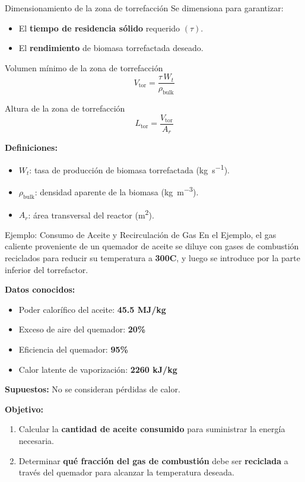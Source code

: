 \documentclass[main.tex]{subfiles}
\begin{document}
\begin{frame}{Dimensionamiento de la zona de torrefacción}
\footnotesize
Se dimensiona para garantizar:
\begin{itemize}
  \item El \textbf{tiempo de residencia sólido} requerido $(\tau)$.
  \item El \textbf{rendimiento} de biomasa torrefactada deseado.
\end{itemize}
\begin{block}{Volumen mínimo de la zona de torrefacción}
\[
V_{\text{tor}}=\frac{\tau\,W_t}{\rho_{\text{bulk}}}
\]
\end{block}
\begin{block}{Altura de la zona de torrefacción}
\[
L_{\text{tor}}=\frac{V_{\text{tor}}}{A_r}
\]
\end{block}
\textbf{Definiciones:}
\begin{itemize}
  \item $W_t$: tasa de producción de biomasa torrefactada (\si{kg.s^{-1}}).
  \item $\rho_{\text{bulk}}$: densidad aparente de la biomasa (\si{kg.m^{-3}}).
  \item $A_r$: área transversal del reactor (\si{m^2}).
\end{itemize}
\end{frame}

\begin{frame}{Ejemplo: Consumo de Aceite y Recirculación de Gas}
\footnotesize
En el Ejemplo, el gas caliente proveniente de un quemador de aceite se diluye con gases de combustión reciclados para reducir su temperatura a \textbf{300\textdegree C}, y luego se introduce por la parte inferior del torrefactor.

\textbf{Datos conocidos:}
\begin{itemize}
  \item Poder calorífico del aceite: \textbf{45.5 MJ/kg}
  \item Exceso de aire del quemador: \textbf{20\%}
  \item Eficiencia del quemador: \textbf{95\%}
  \item Calor latente de vaporización: \textbf{2260 kJ/kg}
\end{itemize}

\textbf{Supuestos:} No se consideran pérdidas de calor.

\textbf{Objetivo:}
\begin{enumerate}
  \item Calcular la \textbf{cantidad de aceite consumido} para suministrar la energía necesaria.
  \item Determinar \textbf{qué fracción del gas de combustión} debe ser \textbf{reciclada} a través del quemador para alcanzar la temperatura deseada.
\end{enumerate}
\end{frame}
\end{document}
